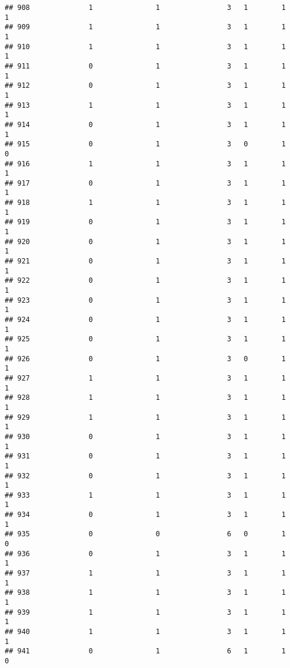 \documentclass[]{article}
\begin{document}
\begin{verbatim}
## 908              1               1                3   1        1        1
## 909              1               1                3   1        1        1
## 910              1               1                3   1        1        1
## 911              0               1                3   1        1        1
## 912              0               1                3   1        1        1
## 913              1               1                3   1        1        1
## 914              0               1                3   1        1        1
## 915              0               1                3   0        1        0
## 916              1               1                3   1        1        1
## 917              0               1                3   1        1        1
## 918              1               1                3   1        1        1
## 919              0               1                3   1        1        1
## 920              0               1                3   1        1        1
## 921              0               1                3   1        1        1
## 922              0               1                3   1        1        1
## 923              0               1                3   1        1        1
## 924              0               1                3   1        1        1
## 925              0               1                3   1        1        1
## 926              0               1                3   0        1        1
## 927              1               1                3   1        1        1
## 928              1               1                3   1        1        1
## 929              1               1                3   1        1        1
## 930              0               1                3   1        1        1
## 931              0               1                3   1        1        1
## 932              0               1                3   1        1        1
## 933              1               1                3   1        1        1
## 934              0               1                3   1        1        1
## 935              0               0                6   0        1        0
## 936              0               1                3   1        1        1
## 937              1               1                3   1        1        1
## 938              1               1                3   1        1        1
## 939              1               1                3   1        1        1
## 940              1               1                3   1        1        1
## 941              0               1                6   1        1        0

\end{verbatim}
\end{document}
